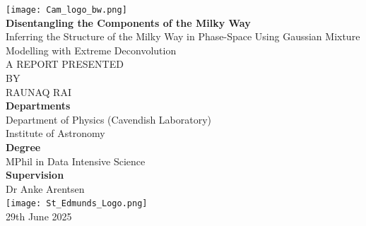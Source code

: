 \documentclass[a4paper,12pt]{article}
\begin{document}
\begin{titlepage}
    \centering
    \texttt{[image: Cam\_logo\_bw.png]}\\[1.5cm]


    {\large \bfseries Disentangling the Components of the Milky Way}\\[0.75cm]
    { \textsc Inferring the Structure of the Milky Way in Phase-Space Using Gaussian Mixture Modelling with Extreme Deconvolution}\\[1.5cm]

    \vspace{0.5cm}
    \large
    \textsc{A REPORT PRESENTED}\\[0.3cm]
    \textsc{BY}\\[0.3cm]
    \textsc{RAUNAQ RAI}\\[1cm]

    \normalsize
    \textbf{Departments}\\[0.3cm]
    Department of Physics (Cavendish Laboratory)\\
    Institute of Astronomy\\[1cm]

    \textbf{Degree}\\[0.3cm]
    MPhil in Data Intensive Science\\[1cm]

    \textbf{Supervision}\\[0.3cm]
    Dr Anke Arentsen\\

    \vfill
    \texttt{[image: St\_Edmunds\_Logo.png]}\\[0.25cm]
    29th June 2025

\end{titlepage}
\end{document}
